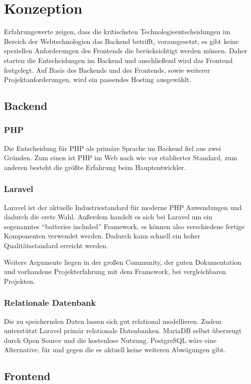 \section{Konzeption}
Erfahrungswerte zeigen, dass die kritischsten Technologieentscheidungen im Bereich der Webtechnologien das Backend betrifft, vorausgesetzt, es gibt keine speziellen Anforderungen des Frontends die berücksichtigt werden müssen.
Daher starten die Entscheidungen im Backend und anschließend wird das Frontend festgelegt.
Auf Basis des Backends und des Frontends, sowie weiterer Projektanforderungen, wird ein passendes Hosting ausgewählt.

\subsection{Backend}

\subsubsection{PHP}
Die Entscheidung für PHP als primäre Sprache im Backend fiel aus zwei Gründen.
Zum einen ist PHP im Web nach wie vor etablierter Standard, zum anderen besteht die größte Erfahrung beim Hauptentwickler.

\subsubsection{Laravel}
Laravel ist der aktuelle Industriestandard für moderne PHP Anwendungen und dadurch die erste Wahl.
Außerdem handelt es sich bei Laravel um ein sogenanntes \enquote{batteries included} Framework, es können also verschiedene fertige Komponenten verwendet werden.
Dadurch kann schnell ein hoher Qualitätsstandard erreicht werden.

Weitere Argumente liegen in der großen Community, der guten Dokumentation und vorhandene Projekterfahrung mit dem Framework, bei vergleichbaren Projekten.

\subsubsection{Relationale Datenbank}
Die zu speichernden Daten lassen sich gut relational modellieren.
Zudem unterstützt Laravel primär relationale Datenbanken.
MariaDB selbst überzeugt durch Open Source und die kostenlose Nutzung.
PostgreSQL wäre eine Alternative, für und gegen die es aktuell keine weiteren Abwägungen gibt.
\newpage

\subsection{Frontend}

